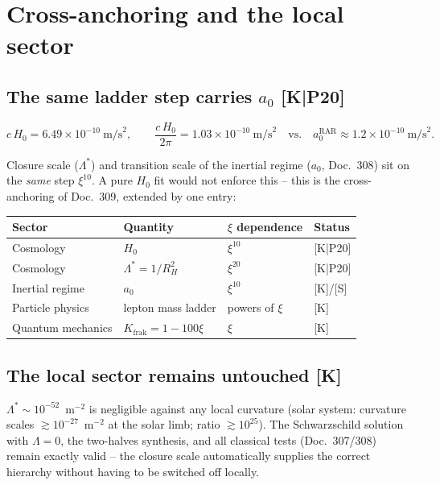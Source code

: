 \chapter{Cross-anchoring and the local sector}

\section{The same ladder step carries $a_0$ [K|P20]}

\[
  c\,H_0 = 6.49\times10^{-10}~\text{m/s}^2,
  \qquad
  \frac{c\,H_0}{2\pi} = 1.03\times10^{-10}~\text{m/s}^2
  \quad\text{vs.}\quad
  a_0^\text{RAR} \approx 1.2\times10^{-10}~\text{m/s}^2.
\]

Closure scale ($\Lambda^{*}$) and transition scale of the inertial
regime ($a_0$, Doc.~308) sit on the \emph{same} step $\xi^{10}$. A
pure $H_0$ fit would not enforce this -- this is the cross-anchoring
of Doc.~309, extended by one entry:

\begin{center}
\begin{tabular}{llll}
\toprule
Sector & Quantity & $\xi$ dependence & Status \\
\midrule
Cosmology & $H_0$ & $\xi^{10}$ & [K|P20] \\
Cosmology & $\Lambda^{*} = 1/R_H^2$ & $\xi^{20}$ & [K|P20] \\
Inertial regime & $a_0$ & $\xi^{10}$ & [K]/[S] \\
Particle physics & lepton mass ladder & powers of $\xi$ & [K] \\
Quantum mechanics & $K_\text{frak} = 1-100\xi$ & $\xi$ & [K] \\
\bottomrule
\end{tabular}
\end{center}

\section{The local sector remains untouched [K]}

$\Lambda^{*} \sim 10^{-52}$~m$^{-2}$ is negligible against any local
curvature (solar system: curvature scales
$\gtrsim 10^{-27}$~m$^{-2}$ at the solar limb; ratio
$\gtrsim 10^{25}$). The Schwarzschild solution with $\Lambda = 0$,
the two-halves synthesis, and all classical tests (Doc.~307/308)
remain exactly valid -- the closure scale automatically supplies the
correct hierarchy without having to be switched off locally.


